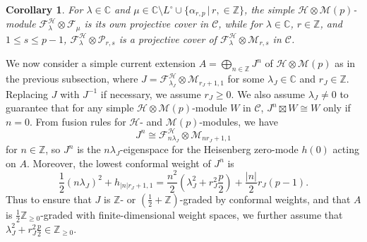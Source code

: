 \documentclass[11pt, reqno]{amsart}
\newtheorem{cor}[thm]{Corollary}
\theoremstyle{definition}\newtheorem{defi}[thm]{Definition}
\theoremstyle{definition}\newtheorem{rem}[thm]{Remark}
\theoremstyle{definition}\newtheorem{exam}[thm]{Example}
\theoremstyle{definition}\newtheorem{assum}[thm]{Assumption}
\newcommand{\cH}{\mathcal{H}}
\newcommand{\cM}{\mathcal{M}}
\newcommand{\cF}{\mathcal{F}}
\newcommand{\cP}{\mathcal{P}}
\newcommand{\cC}{\mathcal{C}}
\newcommand{\CC}{\mathbb{C}}
\newcommand{\ZZ}{\mathbb{Z}}
\newcommand{\tens}{\boxtimes}
\begin{document}
\begin{cor}\label{cor:proj_cover_in_C}
For $\lambda\in\CC$ and $\mu\in\CC\setminus L^\circ\cup\lbrace\alpha_{r,p}\,\vert\,r,\in\ZZ\rbrace$, the simple $\cH\otimes\cM(p)$-module $\cF^\cH_\lambda\otimes\cF_\mu$ is its own projective cover in $\cC$, while for $\lambda\in\CC$, $r\in\ZZ$, and $1\leq s\leq p-1$, $\cF^\cH_\lambda\otimes\cP_{r,s}$ is a projective cover of $\cF^\cH_\lambda\otimes\cM_{r,s}$ in $\cC$.
\end{cor}

We now consider a simple current extension $A=\bigoplus_{n\in\ZZ} J^n$ of $\cH\otimes\cM(p)$ as in the previous subsection, where $J=\cF^\cH_{\lambda_J}\otimes\cM_{r_J+1,1}$ for some $\lambda_J\in\CC$ and $r_J\in\ZZ$. Replacing $J$ with $J^{-1}$ if necessary, we assume $r_J\geq 0$. We also assume $\lambda_J\neq 0$ to guarantee that for any simple $\cH\otimes\cM(p)$-module $W$ in $\cC$, $J^n\tens W\cong W$ only if $n=0$.  From fusion rules for $\cH$- and $\cM(p)$-modules, we have
\begin{equation*}
J^n\cong\cF^\cH_{n\lambda_J}\otimes\cM_{n r_J+1,1}
\end{equation*}
for $n\in\ZZ$, so $J^n$ is the $n\lambda_J$-eigenspace for the Heisenberg zero-mode $h(0)$ acting on $A$. Moreover, the lowest conformal weight of $J^n$ is
\begin{equation}\label{eqn:lowest_wt_of_Jn}
\frac{1}{2}(n\lambda_J)^2+h_{\vert n\vert r_J+1,1} =\frac{n^2}{2}\left(\lambda_J^2+r_J^2\frac{p}{2}\right) +\frac{\vert n\vert}{2}r_J(p-1).
\end{equation}
Thus to ensure that $J$ is $\ZZ$- or $(\frac{1}{2}+\ZZ)$-graded by conformal weights, and that $A$ is $\frac{1}{2}\ZZ_{\geq 0}$-graded with finite-dimensional weight spaces, we further assume that $\lambda_J^2+r_J^2\frac{p}{2}\in\ZZ_{\geq 0}$.
\end{document}

